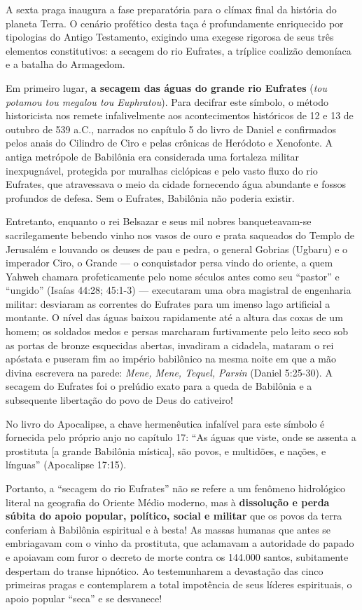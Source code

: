 A sexta praga inaugura a fase preparatória para o clímax final da história do planeta Terra. O cenário profético desta taça é profundamente enriquecido por tipologias do Antigo Testamento, exigindo uma exegese rigorosa de seus três elementos constitutivos: a secagem do rio Eufrates, a tríplice coalizão demoníaca e a batalha do Armagedom.

Em primeiro lugar, \textbf{a secagem das águas do grande rio Eufrates} (\textit{tou potamou tou megalou tou Euphratou}).
Para decifrar este símbolo, o método historicista nos remete infalivelmente aos acontecimentos históricos de 12 e 13 de outubro de 539 a.C., narrados no capítulo 5 do livro de Daniel e confirmados pelos anais do Cilindro de Ciro e pelas crônicas de Heródoto e Xenofonte. A antiga metrópole de Babilônia era considerada uma fortaleza militar inexpugnável, protegida por muralhas ciclópicas e pelo vasto fluxo do rio Eufrates, que atravessava o meio da cidade fornecendo água abundante e fossos profundos de defesa. Sem o Eufrates, Babilônia não poderia existir.

Entretanto, enquanto o rei Belsazar e seus mil nobres banqueteavam-se sacrilegamente bebendo vinho nos vasos de ouro e prata saqueados do Templo de Jerusalém e louvando os deuses de pau e pedra, o general Gobrias (Ugbaru) e o imperador Ciro, o Grande — o conquistador persa vindo do oriente, a quem Yahweh chamara profeticamente pelo nome séculos antes como seu ``pastor'' e ``ungido'' (Isaías 44:28; 45:1-3) — executaram uma obra magistral de engenharia militar: desviaram as correntes do Eufrates para um imenso lago artificial a montante. O nível das águas baixou rapidamente até a altura das coxas de um homem; os soldados medos e persas marcharam furtivamente pelo leito seco sob as portas de bronze esquecidas abertas, invadiram a cidadela, mataram o rei apóstata e puseram fim ao império babilônico na mesma noite em que a mão divina escrevera na parede: \textit{Mene, Mene, Tequel, Parsin} (Daniel 5:25-30). A secagem do Eufrates foi o prelúdio exato para a queda de Babilônia e a subsequente libertação do povo de Deus do cativeiro!

No livro do Apocalipse, a chave hermenêutica infalível para este símbolo é fornecida pelo próprio anjo no capítulo 17:
``As águas que viste, onde se assenta a prostituta [a grande Babilônia mística], são povos, e multidões, e nações, e línguas'' (Apocalipse 17:15).

Portanto, a ``secagem do rio Eufrates'' não se refere a um fenômeno hidrológico literal na geografia do Oriente Médio moderno, mas à \textbf{dissolução e perda súbita do apoio popular, político, social e militar} que os povos da terra conferiam à Babilônia espiritual e à besta! As massas humanas que antes se embriagavam com o vinho da prostituta, que aclamavam a autoridade do papado e apoiavam com furor o decreto de morte contra os 144.000 santos, subitamente despertam do transe hipnótico. Ao testemunharem a devastação das cinco primeiras pragas e contemplarem a total impotência de seus líderes espirituais, o apoio popular ``seca'' e se desvanece!


